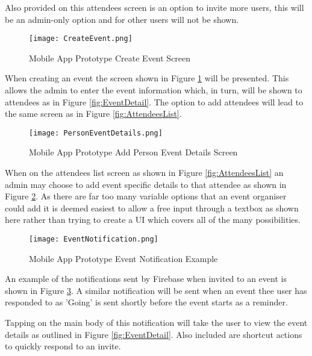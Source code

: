 Also provided on this attendees screen is an option to invite more users, this will be an admin-only option and for other users will not be shown.

\clearpage
\begin{figure}[ht]
  \centering
      \texttt{[image: CreateEvent.png]}
  \caption[Mobile App Prototype Create Event Screen]{Mobile App Prototype Create Event Screen}
  \label{fig:CreateEvent}
\end{figure}

When creating an event the screen shown in Figure \ref{fig:CreateEvent} will be presented. This allows the admin to enter the event information which, in turn, will be shown to attendees as in Figure \ref{fig:EventDetail}. The option to add attendees will lead to the same screen as in Figure \ref{fig:AttendeesList}.

\clearpage
\begin{figure}[ht]
  \centering
      \texttt{[image: PersonEventDetails.png]}
  \caption[Mobile App Prototype Add Person Event Details Screen]{Mobile App Prototype Add Person Event Details Screen}
  \label{fig:PersonEventDetails}
\end{figure}

When on the attendees list screen as shown in Figure \ref{fig:AttendeesList} an admin may choose to add event specific details to that attendee as shown in Figure \ref{fig:PersonEventDetails}. As there are far too many variable options that an event organiser could add it is deemed easiest to allow a free input through a textbox as shown here rather than trying to create a UI which covers all of the many possibilities.

\clearpage
\begin{figure}[ht]
  \centering
      \texttt{[image: EventNotification.png]}
  \caption[Mobile App Prototype Event Notification Example]{Mobile App Prototype Event Notification Example}
  \label{fig:EventNotification}
\end{figure}

An example of the notifications sent by Firebase when invited to an event is shown in Figure \ref{fig:EventNotification}. A similar notification will be sent when an event thee user has responded to as 'Going' is sent shortly before the event starts as a reminder.

Tapping on the main body of this notification will take the user to view the event details as outlined in Figure \ref{fig:EventDetail}. Also included are shortcut actions to quickly respond to an invite.

